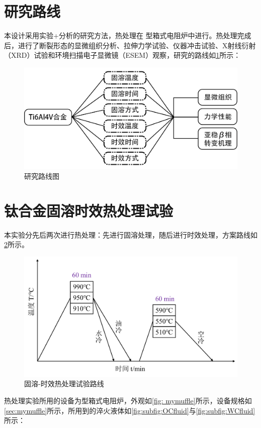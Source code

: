 \section{研究路线}
本设计采用实验+分析的研究方法，热处理在%
型箱式电阻炉中进行。热处理完成后，进行了断裂形态的显微组织分析、拉伸力学试验、仪器冲击试验、X射线衍射（XRD）试验和环境扫描电子显微镜（ESEM）观察，研究的路线如\ref{fig:roadmap}所示：

\begin{figure}[h!]
	\centering
	\includegraphics[width=0.8\linewidth]{pic/路线图}
	\caption{研究路线图}
	\label{fig:roadmap}
\end{figure}
\section{钛合金固溶时效热处理试验}
本实验分先后两次进行热处理：先进行固溶处理，随后进行时效处理，方案路线如\ref{fig: heatway}所示。
\begin{figure}[h!]
	\centering
	\includegraphics[width=0.7\linewidth]{pic/处理路线}
	\caption{固溶-时效热处理试验路线}
	\label{fig: heatway}
\end{figure}

热处理实验所用的设备为型箱式电阻炉，外观如\ref{fig: mymuffle}所示，设备规格如\ref{sec:mymuffle}所示，所用到的淬火液体如\ref{fig:subfig:OCfluid}与\ref{fig:subfig:WCfluid}所示：


